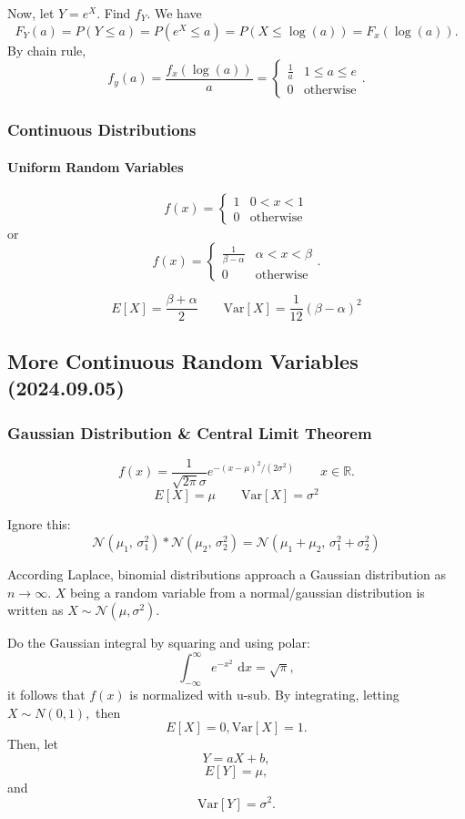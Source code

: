 \documentclass[12pt]{article}
\newcommand{\diffn}[1]{\,\mathrm{d}{#1}}
\begin{document}
Now, let $Y=e^X.$ Find $f_Y.$
We have
\[F_Y(a)=P(Y\le a)=P(e^X\le a)=P(X\le \log(a))=F_x(\log(a)).\]
By chain rule,
\[f_y(a)=\frac{f_x(\log(a))}{a}=\begin{cases}
    \frac{1}{a}&1\le a\le e\\
    0&\text{otherwise}
\end{cases}.\]
\subsubsection{Continuous Distributions}

\paragraph{Uniform Random Variables}
\[f(x)=\begin{cases}
    1&0< x<1\\
    0&\text{otherwise}
\end{cases}\]
or
\[f(x)=\begin{cases}
    \frac{1}{\beta-\alpha}&\alpha<x<\beta\\
    0&\text{otherwise}
\end{cases}.\]

\[
E[X] = \frac{\beta + \alpha}{2} \qquad \mathrm{Var}[X] = \frac{1}{12} (\beta - \alpha)^2
\]


\newpage
\subsection{More Continuous Random Variables (2024.09.05)}

\subsubsection{Gaussian Distribution \& Central Limit Theorem}
\[
f(x) = \frac{1}{\sqrt{2\pi} \sigma} e^{-(x-\mu)^2/(2\sigma^2)}\qquad x\in\mathbb{R}.
\]
\[
E[X] = \mu \qquad \text{Var}[X] = \sigma^2
\]

Ignore this:
\[
\mathcal{N}(\mu_1,\,\sigma_1^2) \ast \mathcal{N}(\mu_2,\,\sigma_2^2) = \mathcal{N}\left(\mu_1 + \mu_2,\,\sigma_1^2 + \sigma_2^2\right)
\]

According Laplace, binomial distributions approach a Gaussian distribution as $n\to\infty$. $X$ being a random variable from a normal/gaussian distribution is written as $X \sim \mathcal{N}(\mu,\sigma^2)$.

Do the Gaussian integral by squaring and using polar:
\[
\int_{-\infty}^\infty e^{-x^2}\,\diffn{x} = \sqrt{\pi},
\]
it follows that 
$f(x)$ is normalized with u-sub.
By integrating, letting $X\sim N(0,1),$ then
\[E[X] = 0, \mathrm{Var}[X] = 1.\]
Then, let 
\[Y=aX+b,\]
\[E[Y]=\mu,\]
and
\[\mathrm{Var}[Y] = \sigma^2.\]
\end{document}
